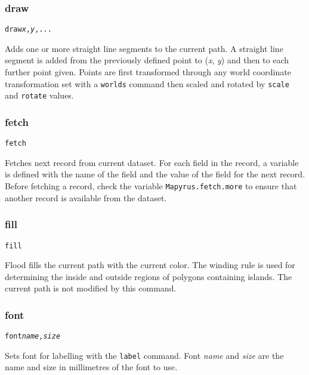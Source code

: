 \subsubsection{draw}

\begin{alltt}
draw \textit{x}, \textit{y}, ...
\end{alltt}

Adds one or more straight line segments to the current path.
A straight line segment is added from the previously defined point
to (\textit{x}, \textit{y}) and then to each further point given.
Points are first transformed through any world coordinate
transformation set with a \texttt{worlds} command
then scaled and rotated by \texttt{scale}
and \texttt{rotate} values.

\subsubsection{fetch}

\begin{alltt}
fetch
\end{alltt}

Fetches next record from current dataset.
For each field in the record, a variable is defined with the name
of the field and the value of the field for the next record.
Before fetching a record, check the variable
\texttt{Mapyrus.fetch.more}
to ensure that another record is available from the dataset.

\subsubsection{fill}

\begin{alltt}
fill
\end{alltt}

Flood fills the current path with the current color.
The winding rule is used for determining the inside and outside
regions of polygons containing islands.
The current path is not modified by this command.

\subsubsection{font}

\begin{alltt}
font \textit{name}, \textit{size}
\end{alltt}

Sets font for labelling with the \texttt{label} command.
Font \textit{name} and \textit{size} are the name and size in
millimetres of the font to use.

